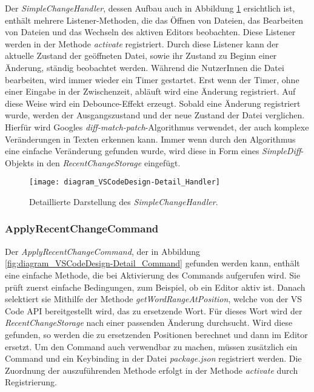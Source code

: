 Der \emph{SimpleChangeHandler}, 
dessen Aufbau auch in Abbildung \ref{fig:diagram_VSCodeDesign-Detail_Handler} ersichtlich ist,
enthält mehrere Listener-Methoden,
die das Öffnen von Dateien, das Bearbeiten von Dateien und das
Wechseln des aktiven Editors beobachten. Diese Listener werden
in der Methode \emph{activate} registriert. Durch diese Listener
kann der aktuelle Zustand der geöffneten Datei, sowie ihr Zustand
zu Beginn einer Änderung, ständig beobachtet werden. Während
die NutzerInnen die Datei bearbeiten, wird immer wieder ein
Timer gestartet. Erst wenn der Timer, ohne einer Eingabe
in der Zwischenzeit, abläuft wird eine Änderung registriert. Auf diese 
Weise wird ein Debounce-Effekt erzeugt. Sobald eine Änderung
registriert wurde, werden der Ausgangszustand und der neue Zustand
der Datei verglichen. Hierfür wird Googles 
\emph{diff-match-patch}-Algorithmus \cite{DiffMatchPatchGithub}
verwendet, der auch komplexe Veränderungen in Texten erkennen kann. 
Immer wenn durch den Algorithmus eine einfache Veränderung gefunden
wurde, wird diese in Form eines \emph{SimpleDiff}-Objekts in
den \emph{RecentChangeStorage} eingefügt.

\begin{figure}
    \centering
    \texttt{[image: diagram\_VSCodeDesign-Detail\_Handler]}
    \caption{Detaillierte Darstellung des \emph{SimpleChangeHandler}.}
    \label{fig:diagram_VSCodeDesign-Detail_Handler}
\end{figure}

\subsubsection{ApplyRecentChangeCommand}

Der \emph{ApplyRecentChangeCommand}, 
der in Abbildung \ref{fig:diagram_VSCodeDesign-Detail_Command} gefunden werden kann,
enthält eine einfache Methode,
die bei Aktivierung des Commands aufgerufen wird. Sie prüft zuerst
einfache Bedingungen, zum Beispiel, ob ein Editor aktiv ist.
Danach selektiert sie Mithilfe der Methode \emph{getWordRangeAtPosition},
welche von der VS Code API bereitgestellt wird, das zu ersetzende Wort.
Für dieses Wort wird der \emph{RecentChangeStorage} nach einer passenden
Änderung durchsucht. Wird diese gefunden, so werden die zu ersetzenden
Positionen berechnet und dann im Editor ersetzt. Um den Command auch 
verwendbar zu machen, müssen zusätzlich ein Command und ein Keybinding
in der Datei \emph{package.json} registriert werden. Die Zuordnung
der auszuführenden Methode erfolgt in der Methode \emph{activate}
durch Registrierung.

